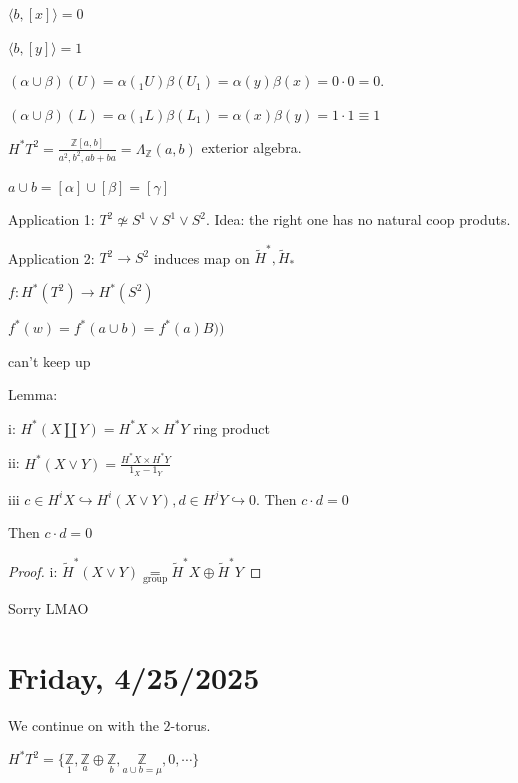 \documentclass{article}
\theoremstyle{definition}
\begin{document}
    \(\langle b, [x] \rangle = 0\) 

    \(\langle b, [y] \rangle = 1\)

    \((\alpha \cup \beta)(U) = \alpha(_1 U)\beta(U_1) = \alpha(y) \beta(x) = 0 \cdot 0 = 0\).

    \((\alpha \cup \beta)(L) = \alpha(_1 L) \beta(L_1) = \alpha(x) \beta(y) = 1 \cdot 1 \equiv  1 \)
    
    \(H^{\ast} T^2 = \frac{\mathbb{Z} [a,b]}{a^2, b^2, ab+ba} = \Lambda_\mathbb{Z} (a,b)\) exterior algebra.
    
    \(a\cup b = [\alpha] \cup [\beta] = [\gamma]\)
    
    Application 1: \(T^2 \not\simeq S^1 \vee S^1 \vee S^2\). Idea: the right one has no natural coop produts.

    Application 2: \(T^2 \to S^2\) induces map on \(\widetilde{H}^{\ast}, \widetilde{H}_{\ast}\) 

    \(f: H^{\ast}(T^2) \to H^{\ast} (S^2)\) 

    \(f^{\ast} (w) = f^{\ast} (a\cup b) = f^{\ast} (a) B))\) 

    can't keep up

    Lemma:

    i: \(H^{\ast} (X \coprod Y) = H^{\ast} X \times H^{\ast} Y\) ring product

    ii: \(H^{\ast} (X\vee Y) = \frac{H^{\ast} X \times H^{\ast} Y}{1_X - 1_Y}\)
    
    iii \(c\in H^i X \hookrightarrow H^i(X \vee Y), d\in H^j Y \hookrightarrow 0\). Then \(c \cdot d = 0\) 

    Then \(c \cdot d = 0\)

    \begin{proof}
        i: \(\widetilde{H}^{\ast} (X \vee Y) \underset{\text{group}}{=} \widetilde{H}^{\ast} X \oplus \widetilde{H}^{\ast} Y\) 
    \end{proof}

    Sorry LMAO

    \section*{Friday, 4/25/2025}
    
    We continue on with the \(2\)-torus.

    \(H^{\ast} T^2 = \{ \underset{1}{\mathbb{Z}}, \underset{a}{\mathbb{Z}} \oplus \underset{b}{\mathbb{Z}} , \underset{a\cup b = \mu}{\mathbb{Z}} , 0, \cdots \} \) 
\end{document}
